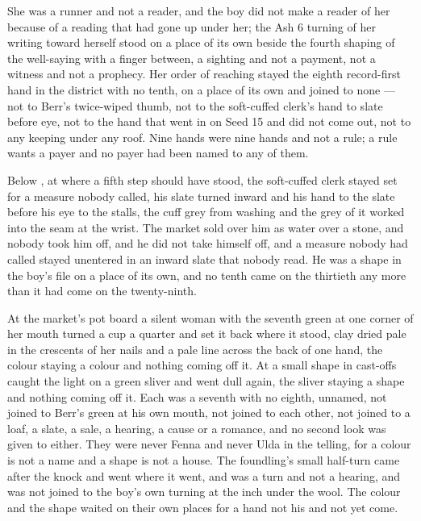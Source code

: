 She was a runner and not a reader, and the boy did not make a reader of her because of a reading that had gone up under her; the Ash 6 turning of her writing toward herself stood on a place of its own beside the fourth shaping of the well-saying with a finger between, a sighting and not a payment, not a witness and not a prophecy. Her order of reaching stayed the eighth record-first hand in the district with no tenth, on a place of its own and joined to none --- not to Berr's twice-wiped thumb, not to the soft-cuffed clerk's hand to slate before eye, not to the hand that went in on Seed 15 and did not come out, not to any keeping under any roof. Nine hands were nine hands and not a rule; a rule wants a payer and no payer had been named to any of them.

Below , at  where a fifth step should have stood, the soft-cuffed clerk stayed set for a measure nobody called, his slate turned inward and his hand to the slate before his eye to the stalls, the cuff grey from washing and the grey of it worked into the seam at the wrist. The market sold over him as water over a stone, and nobody took him off, and he did not take himself off, and a measure nobody had called stayed unentered in an inward slate that nobody read. He was a shape in the boy's file on a place of its own, and no tenth came on the thirtieth any more than it had come on the twenty-ninth.

At the market's pot board a silent woman with the seventh green at one corner of her mouth turned a cup a quarter and set it back where it stood, clay dried pale in the crescents of her nails and a pale line across the back of one hand, the colour staying a colour and nothing coming off it. At  a small shape in cast-offs caught the light on a green sliver and went dull again, the sliver staying a shape and nothing coming off it. Each was a seventh with no eighth, unnamed, not joined to Berr's green at his own mouth, not joined to each other, not joined to a loaf, a slate, a sale, a hearing, a cause or a romance, and no second look was given to either. They were never Fenna and never Ulda in the telling, for a colour is not a name and a shape is not a house. The foundling's small half-turn came after the knock and went where it went, and was a turn and not a hearing, and was not joined to the boy's own turning at the inch under the wool. The colour and the shape waited on their own places for a hand not his and not yet come.


